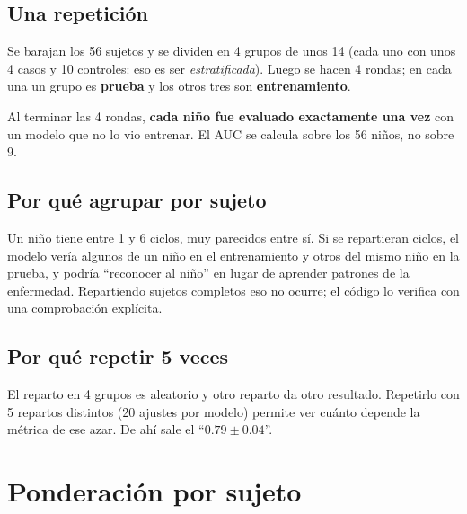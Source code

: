 \documentclass[11pt,a4paper]{article}
\begin{document}
\subsection{Una repetición}

Se barajan los 56 sujetos y se dividen en 4 grupos de unos 14 (cada uno con unos 4 casos y 10 controles: eso es ser \emph{estratificada}). Luego se hacen 4 rondas; en cada una un grupo es \textbf{prueba} y los otros tres son \textbf{entrenamiento}.

\begin{center}
\end{center}

Al terminar las 4 rondas, \textbf{cada niño fue evaluado exactamente una vez} con un modelo que no lo vio entrenar. El AUC se calcula sobre los 56 niños, no sobre 9.

\subsection{Por qué agrupar por sujeto}

Un niño tiene entre 1 y 6 ciclos, muy parecidos entre sí. Si se repartieran ciclos, el modelo vería algunos de un niño en el entrenamiento y otros del mismo niño en la prueba, y podría ``reconocer al niño'' en lugar de aprender patrones de la enfermedad. Repartiendo sujetos completos eso no ocurre; el código lo verifica con una comprobación explícita.

\subsection{Por qué repetir 5 veces}

El reparto en 4 grupos es aleatorio y otro reparto da otro resultado. Repetirlo con 5 repartos distintos (20 ajustes por modelo) permite ver cuánto depende la métrica de ese azar. De ahí sale el ``$0.79 \pm 0.04$''.

\section{Ponderación por sujeto}
\end{document}
